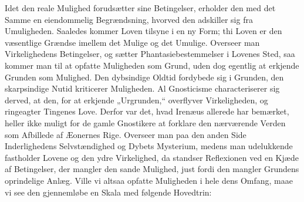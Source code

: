 \documentclass[12pt]{book}
\begin{document}
Idet den reale Mulighed forudsætter sine Betingelser, erholder den med det Samme en
eiendommelig Begrændsning, hvorved den adskiller sig fra Umuligheden. Saaledes kommer Loven
tilsyne i en ny Form; thi Loven er den væsentlige Grændse imellem det Mulige og det Umulige.
Overseer man Virkelighedens Betingelser, og sætter Phantasiebestemmelser i Lovenes Sted, saa
kommer man til at opfatte Muligheden som Grund, uden dog egentlig at erkjende Grunden som
Mulighed. Den dybsindige Oldtid fordybede sig i Grunden, den skarpsindige Nutid kriticerer
Muligheden. Al Gnosticisme characteriserer sig derved, at den, for at erkjende „Urgrunden,“
overflyver Virkeligheden, og ringeagter Tingenes Love. Derfor var det, hvad Irenæus allerede
har bemærket, heller ikke muligt for de gamle Gnostikere at forklare den nærværende Verden
som Afbillede af Æonernes Rige. Overseer man paa den anden Side Inderlighedens
Selvstændighed og Dybets Mysterium, medens man udelukkende fastholder Lovene og den ydre
Virkelighed, da standser Reflexionen ved en Kjæde af Betingelser, der mangler den sande
Mulighed, just fordi den mangler Grundens oprindelige Anlæg. Ville vi altsaa opfatte
Muligheden i hele dens Omfang, maae vi see den gjennemløbe en Skala med følgende Hovedtrin:
\end{document}
